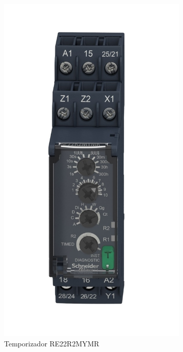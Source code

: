 \begin{figure}
	\centering
	\begin{subfigure}[b]{0.3\textwidth}
		\centering
		\includegraphics[width=\textwidth]{Imagenes/RE22R2MYMR}
		\caption{Temporizador RE22R2MYMR \cite{Scheneider3} }
		\label{fig:imagen}
	\end{subfigure}
	\hfill
	\begin{subfigure}[b]{0.5\textwidth}

\end{subfigure}
\end{figure}
